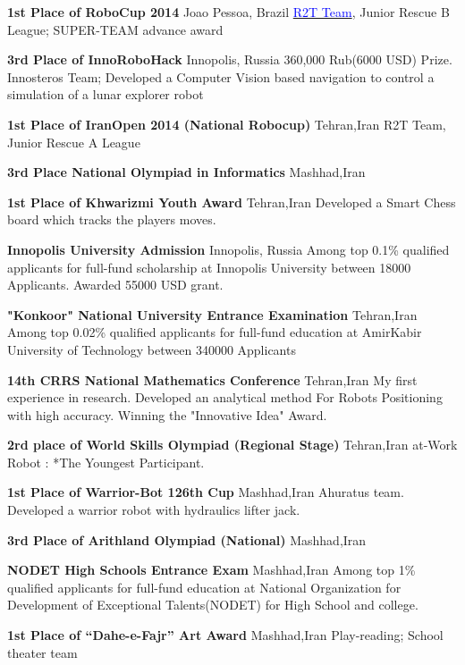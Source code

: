{\textbf{1st Place of RoboCup 2014}}
{Joao Pessoa, Brazil}
{}
{}
{
\href{http://www.robocup2014.org/?page_id=3318}{\textcolor{blue}{R2T Team}}, Junior Rescue B League; SUPER-TEAM advance award}


{\textbf{3rd Place of InnoRoboHack }}
{Innopolis, Russia}
{}
{}
{
360,000 Rub(6000 USD) Prize.
Innosteros Team; Developed a Computer Vision based navigation to control a simulation of a lunar explorer robot 
}
 
 
{\textbf{1st Place of IranOpen 2014 (National Robocup)}}
{Tehran,Iran}
{}
{}
{
	R2T Team, Junior Rescue A League
}

{\textbf{3rd Place National Olympiad in Informatics }}
{Mashhad,Iran}
{}
{}
{	
}

{\textbf{1st Place of Khwarizmi Youth Award }}
{Tehran,Iran}
{}
{}
{
    Developed a Smart Chess board which tracks the players moves.
}



{\textbf{Innopolis University Admission}}
{Innopolis, Russia}
{}
{}
{
Among top 0.1\% qualified applicants for full-fund scholarship at Innopolis University between 18000 Applicants. Awarded 55000 USD grant.
}

{\textbf{"Konkoor" National University Entrance Examination}}
{Tehran,Iran}
{}
{}
{
Among top 0.02\% qualified applicants for full-fund education at AmirKabir University of Technology between 340000 Applicants
}
  
{\textbf{14th CRRS National Mathematics Conference}}
{Tehran,Iran}
{}
{}
{
My first experience in research. Developed an analytical method For Robots Positioning with high accuracy. Winning the "Innovative Idea" Award.
}


{\textbf{2rd place of World Skills Olympiad (Regional Stage)}}
{Tehran,Iran}
{}
{}
{
  at-Work Robot : *The Youngest Participant.
}


{\textbf{1st Place of Warrior-Bot 126th Cup }}
{Mashhad,Iran}
{}
{}
{
   Ahuratus team. Developed a warrior robot with hydraulics lifter jack.
}


{\textbf{3rd Place of Arithland Olympiad (National) }}
{Mashhad,Iran}
{}
{}
{}

{\textbf{NODET High Schools Entrance Exam}}
{Mashhad,Iran}
{}
{}
{
Among top 1\% qualified applicants for full-fund education at National Organization for Development of Exceptional Talents(NODET) for High School and college.
}

{\textbf{1st Place of “Dahe-e-Fajr” Art Award }}
{Mashhad,Iran}
{}
{}
{
	Play-reading; School theater team
}
